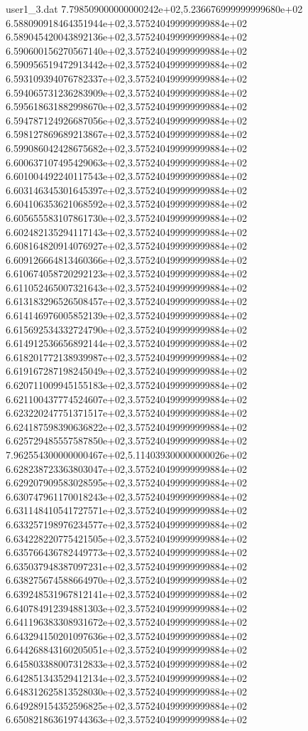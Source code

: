 \begin{filecontents}{user1_3.dat}
7.798509000000000242e+02,5.236676999999999680e+02
6.588090918464351944e+02,3.575240499999999884e+02
6.589045420043892136e+02,3.575240499999999884e+02
6.590600156270567140e+02,3.575240499999999884e+02
6.590956519472913442e+02,3.575240499999999884e+02
6.593109394076782337e+02,3.575240499999999884e+02
6.594065731236283909e+02,3.575240499999999884e+02
6.595618631882998670e+02,3.575240499999999884e+02
6.594787124926687056e+02,3.575240499999999884e+02
6.598127869689213867e+02,3.575240499999999884e+02
6.599086042428675682e+02,3.575240499999999884e+02
6.600637107495429063e+02,3.575240499999999884e+02
6.601004492240117543e+02,3.575240499999999884e+02
6.603146345301645397e+02,3.575240499999999884e+02
6.604106353621068592e+02,3.575240499999999884e+02
6.605655583107861730e+02,3.575240499999999884e+02
6.602482135294117143e+02,3.575240499999999884e+02
6.608164820914076927e+02,3.575240499999999884e+02
6.609126664813460366e+02,3.575240499999999884e+02
6.610674058720292123e+02,3.575240499999999884e+02
6.611052465007321643e+02,3.575240499999999884e+02
6.613183296526508457e+02,3.575240499999999884e+02
6.614146976005852139e+02,3.575240499999999884e+02
6.615692534332724790e+02,3.575240499999999884e+02
6.614912536656892144e+02,3.575240499999999884e+02
6.618201772138939987e+02,3.575240499999999884e+02
6.619167287198245049e+02,3.575240499999999884e+02
6.620711009945155183e+02,3.575240499999999884e+02
6.621100437774524607e+02,3.575240499999999884e+02
6.623220247751371517e+02,3.575240499999999884e+02
6.624187598390636822e+02,3.575240499999999884e+02
6.625729485557587850e+02,3.575240499999999884e+02
7.962554300000000467e+02,5.114039300000000026e+02
6.628238723363803047e+02,3.575240499999999884e+02
6.629207909583028595e+02,3.575240499999999884e+02
6.630747961170018243e+02,3.575240499999999884e+02
6.631148410541727571e+02,3.575240499999999884e+02
6.633257198976234577e+02,3.575240499999999884e+02
6.634228220775421505e+02,3.575240499999999884e+02
6.635766436782449773e+02,3.575240499999999884e+02
6.635037948387097231e+02,3.575240499999999884e+02
6.638275674588664970e+02,3.575240499999999884e+02
6.639248531967812141e+02,3.575240499999999884e+02
6.640784912394881303e+02,3.575240499999999884e+02
6.641196383308931672e+02,3.575240499999999884e+02
6.643294150201097636e+02,3.575240499999999884e+02
6.644268843160205051e+02,3.575240499999999884e+02
6.645803388007312833e+02,3.575240499999999884e+02
6.642851343529412134e+02,3.575240499999999884e+02
6.648312625813528030e+02,3.575240499999999884e+02
6.649289154352596825e+02,3.575240499999999884e+02
6.650821863619744363e+02,3.575240499999999884e+02

\end{filecontents}
